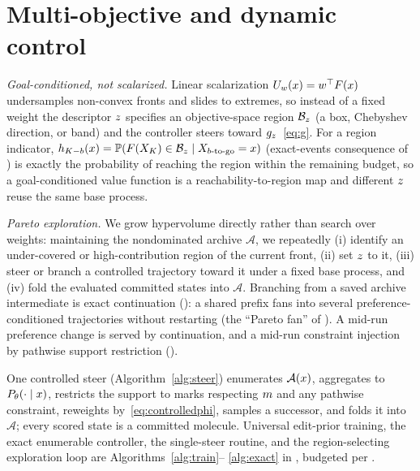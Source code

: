 \section{Multi-objective and dynamic control}
\label{sec:multiobj}

\emph{Goal-conditioned, not scalarized.} Linear scalarization $U_w(x)=w^\top F(x)$ undersamples
non-convex fronts and slides to extremes, so instead of a fixed weight the descriptor $z$ specifies
an objective-space region $\mathcal{B}_z$ (a box, Chebyshev direction, or band) and the controller steers
toward $g_z$~\eqref{eq:g}. For a region indicator, $h_{K-b}(x)=\mathbb{P}(F(X_K)
\in\mathcal{B}_z\mid X_{b\text{-to-go}}=x)$ (exact-events consequence of ) is exactly
the probability of reaching the region within the remaining budget, so a goal-conditioned value function
is a reachability-to-region map and different $z$ reuse the same base process.

\emph{Pareto exploration.} We grow hypervolume directly rather than search over weights: maintaining the
nondominated archive $\mathcal{A}$, we repeatedly (i) identify an under-covered or high-contribution
region of the current front, (ii) set $z$ to it, (iii) steer or branch a controlled trajectory
toward it under a fixed base process, and (iv) fold the evaluated committed states into $\mathcal{A}$.
Branching from a saved archive intermediate is exact continuation (): a shared prefix
fans into several preference-conditioned trajectories without restarting (the ``Pareto fan'' of
). A mid-run preference change is served by continuation, and a mid-run constraint
injection by pathwise support restriction ().

One controlled steer (Algorithm~\ref{alg:steer}) enumerates $\mathcal{A}(x)$, aggregates to
$P_\theta(\cdot\mid x)$, restricts the support to marks respecting $m$ and any pathwise constraint,
reweights by~\eqref{eq:controlledphi}, samples a successor, and folds it into $\mathcal{A}$; every scored
state is a committed molecule. Universal edit-prior training, the exact enumerable controller, the
single-steer routine, and the region-selecting exploration loop are Algorithms~\ref{alg:train}--%
\ref{alg:exact} in , budgeted per .
